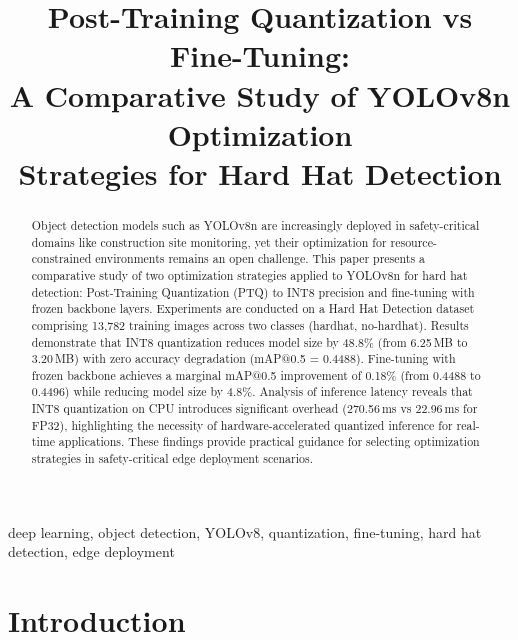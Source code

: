 \documentclass[conference,a4paper]{IEEEtran}
\begin{document}
\title{Post-Training Quantization vs Fine-Tuning:\\A Comparative Study of YOLOv8n Optimization\\Strategies for Hard Hat Detection}

\author{
}

\maketitle

\begin{abstract}
Object detection models such as YOLOv8n are increasingly deployed in safety-critical domains like construction site monitoring, yet their optimization for resource-constrained environments remains an open challenge. This paper presents a comparative study of two optimization strategies applied to YOLOv8n for hard hat detection: Post-Training Quantization (PTQ) to INT8 precision and fine-tuning with frozen backbone layers. Experiments are conducted on a Hard Hat Detection dataset comprising 13,782 training images across two classes (hardhat, no-hardhat). Results demonstrate that INT8 quantization reduces model size by 48.8\% (from 6.25\,MB to 3.20\,MB) with zero accuracy degradation (mAP@0.5 = 0.4488). Fine-tuning with frozen backbone achieves a marginal mAP@0.5 improvement of 0.18\% (from 0.4488 to 0.4496) while reducing model size by 4.8\%. Analysis of inference latency reveals that INT8 quantization on CPU introduces significant overhead (270.56\,ms vs 22.96\,ms for FP32), highlighting the necessity of hardware-accelerated quantized inference for real-time applications. These findings provide practical guidance for selecting optimization strategies in safety-critical edge deployment scenarios.
\end{abstract}

\begin{IEEEkeywords}
deep learning, object detection, YOLOv8, quantization, fine-tuning, hard hat detection, edge deployment
\end{IEEEkeywords}

\section{Introduction}
\end{document}

